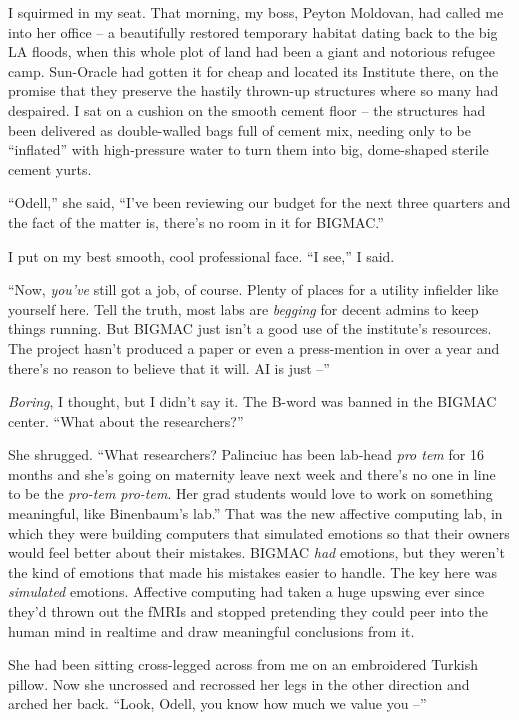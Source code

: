 I squirmed in my seat. That morning, my boss, Peyton Moldovan, had 
called me into her office -- a beautifully restored temporary habitat 
dating back to the big LA floods, when this whole plot of land had been 
a giant and notorious refugee camp. Sun-Oracle had gotten it for cheap 
and located its Institute there, on the promise that they preserve the 
hastily thrown-up structures where so many had despaired. I sat on a 
cushion on the smooth cement floor -- the structures had been delivered 
as double-walled bags full of cement mix, needing only to be 
“inflated” with high-pressure water to turn them into big, 
dome-shaped sterile cement yurts.

“Odell,” she said, “I've been reviewing our budget for the next 
three quarters and the fact of the matter is, there's no room in it for 
BIGMAC.”

I put on my best smooth, cool professional face. “I see,” I said.

“Now, \emph{you've} still got a job, of course. Plenty of places for 
a utility infielder like yourself here. Tell the truth, most labs are 
\emph{begging} for decent admins to keep things running. But BIGMAC 
just isn't a good use of the institute's resources. The project hasn't 
produced a paper or even a press-mention in over a year and there's no 
reason to believe that it will. AI is just --”

\emph{Boring}, I thought, but I didn't say it. The B-word was banned in 
the BIGMAC center. “What about the researchers?”

She shrugged. “What researchers? Palinciuc has been lab-head 
\emph{pro tem} for 16 months and she's going on maternity leave next 
week and there's no one in line to be the \emph{pro-tem pro-tem}. Her 
grad students would love to work on something meaningful, like 
Binenbaum's lab.” That was the new affective computing lab, in which 
they were building computers that simulated emotions so that their 
owners would feel better about their mistakes. BIGMAC \emph{had} 
emotions, but they weren't the kind of emotions that made his mistakes 
easier to handle. The key here was \emph{simulated} emotions. Affective 
computing had taken a huge upswing ever since they'd thrown out the 
fMRIs and stopped pretending they could peer into the human mind in 
realtime and draw meaningful conclusions from it.

She had been sitting cross-legged across from me on an embroidered 
Turkish pillow. Now she uncrossed and recrossed her legs in the other 
direction and arched her back. “Look, Odell, you know how much we 
value you --”

